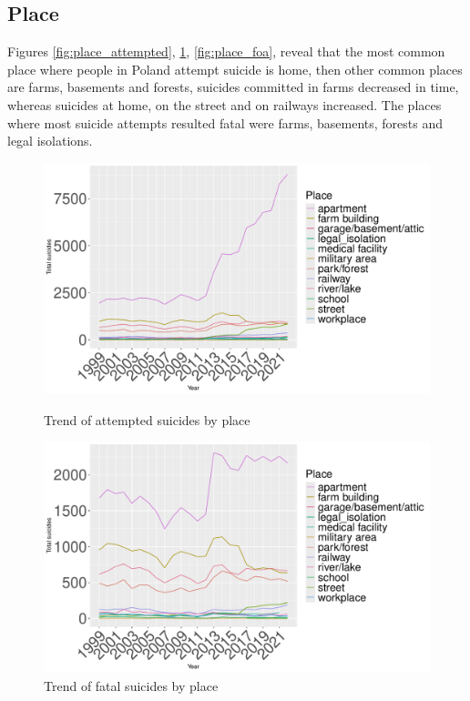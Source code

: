 \documentclass{article}
\begin{document}
\subsection{Place}
%
%
Figures \ref{fig:place_attempted}, \ref{fig:place_fatal}, \ref{fig:place_foa},
reveal that the most common place where people in Poland attempt suicide is 
home, then other common places are farms, basements and forests,
suicides committed in farms decreased in time, whereas suicides at home,
on the street and on railways increased.
The places where most suicide attempts resulted fatal were farms,
basements, forests and legal isolations.
%
%
\begin{figure}[H]
    \centering
    \begin{minipage}{0.65\textwidth}
        \includegraphics[width=\textwidth]{imgs/place_attempted.pdf}
        \caption{Trend of attempted suicides by place }
	\label{fig:place_attempted}
    \end{minipage}
    \hfill
    \begin{minipage}{0.65\textwidth}
        \includegraphics[width=\textwidth]{imgs/place_fatal.pdf}
        \caption{Trend of fatal suicides by place }
	\label{fig:place_fatal}
    \end{minipage}
\end{figure}
\end{document}
